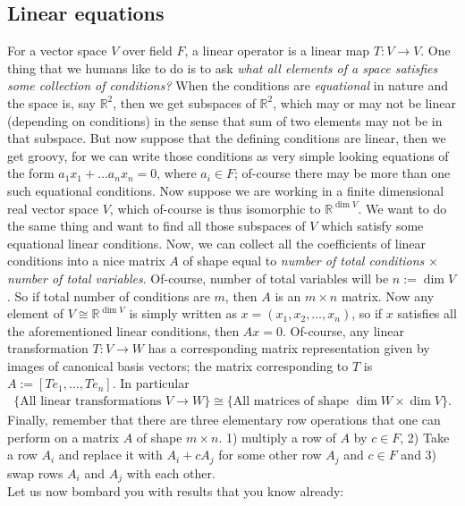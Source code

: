 \documentclass[letterpaper,11pt,twoside]{article}
\theoremstyle{definition}
\theoremstyle{definition}
\theoremstyle{definition}
\theoremstyle{definition}
\theoremstyle{definition}
\theoremstyle{definition}
\theoremstyle{remark}
\theoremstyle{definition}
\newcommand{\isom}{\cong}
\newcommand{\R}[0]{\mathbb{R}}
\begin{document}
	\subsection{Linear equations}
	For a vector space $V$ over field $F$, a linear operator is a linear map $T: V\to V$. One thing that we humans like to do is to ask \textit{what all elements of a space satisfies some collection of conditions?} When the conditions are \textit{equational} in nature and the space is, say $\R^2$, then we get subspaces of $\R^2$, which may or may not be linear (depending on conditions) in the sense that sum of two elements may not be in that subspace. But now suppose that the defining conditions are linear, then we get groovy, for we can write those conditions as very simple looking equations of the form $a_1x_1+\dots a_nx_n = 0$, where $a_i\in F$; of-course there may be more than one such equational conditions. Now suppose we are working in a finite dimensional real vector space $V$, which of-course is thus isomorphic to $\R^{\dim V}$. We want to do the same thing and want to find all those subspaces of $V$ which satisfy some equational linear conditions. Now, we can collect all the coefficients of linear conditions into a nice matrix $A$ of shape equal to \textit{number of total conditions} $\times$ \textit{number of total variables}. Of-course, number of total variables will be $n:=\dim V$. So if total number of conditions are $m$, then $A$ is an $m\times n$ matrix. Now any element of $V\isom \R^{\dim V}$ is simply written as $x = (x_1,x_2,\dots,x_n)$, so if $x$ satisfies all the aforementioned linear conditions, then $Ax = 0$. Of-course, any linear transformation $T : V\to W$ has a corresponding matrix representation given by images of canonical basis vectors; the matrix corresponding to $T$ is $A:= [Te_1,\dots,Te_n]$. In particular
	\begin{align*}
	    \{\text{All linear transformations $V\to W$}\} \isom \{\text{All matrices of shape $\dim W\times \dim V$}\}.
	\end{align*}
    Finally, remember that there are three elementary row operations that one can perform on a matrix $A$ of shape $m\times n$. 1) multiply a row of $A$ by $c\in F$, 2) Take a row $A_i$ and replace it with $A_i + cA_j$ for some other row $A_j$ and $c\in F$ and 3) swap rows $A_i$ and $A_j$ with each other.\\
    Let us now bombard you with results that you know already:
\end{document}
